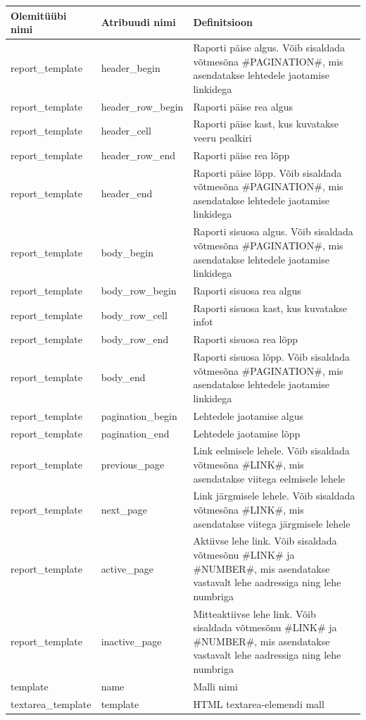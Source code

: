 \documentclass[a4paper,12pt]{article} %
\begin{document}
\begin{table}[H]
\centering
\begin{tabular}{|p{5cm}|p{5cm}|p{5cm}|}
\hline
\rowcolor{rowgray}
Olemitüübi nimi & Atribuudi nimi & Definitsioon \\ \hline
report\_template & header\_begin & Raporti päise algus. Võib sisaldada võtmesõna \#PAGINATION\#, mis asendatakse lehtedele jaotamise linkidega \\ \hline
report\_template & header\_row\_begin & Raporti päise rea algus \\ \hline
report\_template & header\_cell & Raporti päise kast, kus kuvatakse veeru pealkiri \\ \hline
report\_template & header\_row\_end & Raporti päise rea lõpp \\ \hline
report\_template & header\_end & Raporti päise lõpp. Võib sisaldada võtmesõna \#PAGINATION\#, mis asendatakse lehtedele jaotamise linkidega \\ \hline
report\_template & body\_begin & Raporti sisuosa algus. Võib sisaldada võtmesõna \#PAGINATION\#, mis asendatakse lehtedele jaotamise linkidega \\ \hline
report\_template & body\_row\_begin & Raporti sisuosa rea algus \\ \hline
report\_template & body\_row\_cell & Raporti sisuosa kast, kus kuvatakse infot \\ \hline
report\_template & body\_row\_end & Raporti sisuosa rea lõpp \\ \hline
report\_template & body\_end & Raporti sisuosa lõpp. Võib sisaldada võtmesõna \#PAGINATION\#, mis asendatakse lehtedele jaotamise linkidega \\ \hline
report\_template & pagination\_begin & Lehtedele jaotamise algus \\ \hline
report\_template & pagination\_end & Lehtedele jaotamise lõpp \\ \hline
report\_template & previous\_page & Link eelmisele lehele. Võib sisaldada võtmesõna \#LINK\#, mis asendatakse viitega eelmisele lehele \\ \hline
report\_template & next\_page & Link järgmisele lehele. Võib sisaldada võtmesõna \#LINK\#, mis asendatakse viitega järgmisele lehele \\ \hline
report\_template & active\_page & Aktiivse lehe link. Võib sisaldada võtmesõnu \#LINK\# ja \#NUMBER\#, mis asendatakse vastavalt lehe aadressiga ning lehe numbriga \\ \hline
report\_template & inactive\_page & Mitteaktiivse lehe link. Võib sisaldada võtmesõnu \#LINK\# ja \#NUMBER\#, mis asendatakse vastavalt lehe aadressiga ning lehe numbriga \\ \hline
template & name & Malli nimi \\ \hline
textarea\_template & template & HTML textarea-elemendi mall \\ \hline
\end{tabular}
\end{table}
\end{document}
